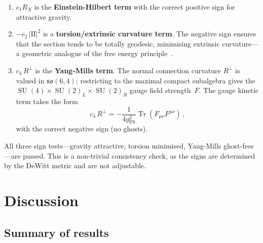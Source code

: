 \documentclass[12pt,a4paper]{article}
\theoremstyle{definition}
\newcommand{\Tr}{\operatorname{Tr}}
\newcommand{\SU}{\operatorname{SU}}
\begin{document}
\begin{enumerate}[nosep]
\item $c_1 R_X$ is the \textbf{Einstein-Hilbert term} with the correct positive sign for attractive gravity.

\item $-c_2\, |\mathrm{I\!I}|^2$ is a \textbf{torsion/extrinsic curvature term}. The negative sign ensures that the section tends to be totally geodesic, minimising extrinsic curvature---a geometric analogue of the free energy principle~\cite{Friston2010}.

\item $c_4\, R^\perp$ is the \textbf{Yang-Mills term}. The normal connection curvature $R^\perp$ is valued in $\mathfrak{so}(6,4)$; restricting to the maximal compact subalgebra gives the $\SU(4) \times \SU(2)_L \times \SU(2)_R$ gauge field strength~$F$.
The gauge kinetic term takes the form
\begin{equation}
c_4\, R^\perp = -\frac{1}{4g_{\mathrm{PS}}^2} \Tr(F_{\mu\nu} F^{\mu\nu})\,,
\end{equation}
with the correct negative sign (no ghosts).
\end{enumerate}

All three sign tests---gravity attractive, torsion minimised, Yang-Mills ghost-free---are passed.
This is a non-trivial consistency check, as the signs are determined by the DeWitt metric and are not adjustable.


\section{Discussion}
\label{sec:discussion}

\subsection{Summary of results}
\end{document}
